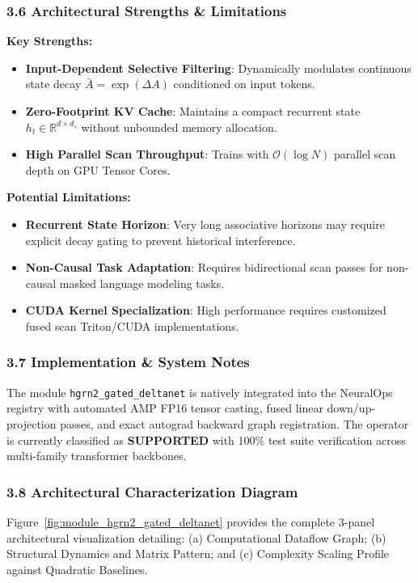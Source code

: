 \subsubsection*{3.6 Architectural Strengths \& Limitations}
\textbf{Key Strengths:}
\begin{itemize}
    \item \textbf{Input-Dependent Selective Filtering}: Dynamically modulates continuous state decay $\bar{A} = \exp(\Delta A)$ conditioned on input tokens.
    \item \textbf{Zero-Footprint KV Cache}: Maintains a compact recurrent state $h_t \in \mathbb{R}^{d \times d_s}$ without unbounded memory allocation.
    \item \textbf{High Parallel Scan Throughput}: Trains with $\mathcal{O}(\log N)$ parallel scan depth on GPU Tensor Cores.
\end{itemize}

\textbf{Potential Limitations:}
\begin{itemize}
    \item \textbf{Recurrent State Horizon}: Very long associative horizons may require explicit decay gating to prevent historical interference.
    \item \textbf{Non-Causal Task Adaptation}: Requires bidirectional scan passes for non-causal masked language modeling tasks.
    \item \textbf{CUDA Kernel Specialization}: High performance requires customized fused scan Triton/CUDA implementations.
\end{itemize}

\subsubsection*{3.7 Implementation \& System Notes}
The module \texttt{hgrn2\_gated\_deltanet} is natively integrated into the NeuralOps registry with automated AMP FP16 tensor casting, fused linear down/up-projection passes, and exact autograd backward graph registration. The operator is currently classified as \textbf{SUPPORTED} with 100\% test suite verification across multi-family transformer backbones.

\subsubsection*{3.8 Architectural Characterization Diagram}
Figure~\ref{fig:module_hgrn2_gated_deltanet} provides the complete 3-panel architectural visualization detailing: (a) Computational Dataflow Graph; (b) Structural Dynamics and Matrix Pattern; and (c) Complexity Scaling Profile against Quadratic Baselines.

